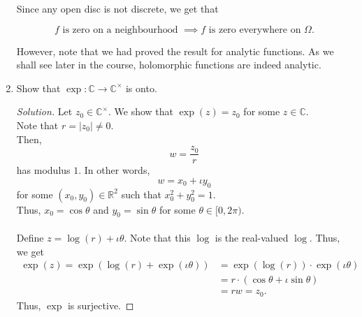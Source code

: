 \documentclass[12pt]{article}
\theoremstyle{definition}
\numberwithin{thm}{section}
\newenvironment{soln}{\begin{proof}[Solution]}{\end{proof}}
\begin{document}
\begin{enumerate}
		Since any open disc is not discrete, we get that

		\begin{mdframed}
			\begin{equation*} 
				f \text{ is zero on a neighbourhood } \implies f \text{ is zero everywhere on }\Omega.
			\end{equation*}
		\end{mdframed}

		However, note that we had proved the result for analytic functions. As we shall see later in the course, holomorphic functions are indeed analytic.
	\item Show that $\exp:\mathbb{C}\to\mathbb{C}^\times$ is onto.
	\begin{soln}
		Let $z_0 \in \mathbb{C}^\times.$ We show that $\exp(z) = z_0$ for some $z \in \mathbb{C}.$ \\
		Note that $r = |z_0| \neq 0.$\\
		Then,
		\begin{equation*} 
			w = \dfrac{z_0}{r}
		\end{equation*}
		has modulus $1.$ In other words,
		\begin{equation*} 
			w = x_0 + \iota y_0
		\end{equation*}
		for some $(x_0, y_0) \in \mathbb{R}^2$ such that $x_0^2 + y_0^2 = 1.$\\
		Thus, $x_0 = \cos\theta$ and $y_0 = \sin\theta$ for some $\theta \in [0, 2\pi).$\\~\\
		Define $z = \log(r) + \iota\theta.$ Note that this $\log$ is the real-valued $\log.$ Thus, we get
		\begin{align*} 
			\exp(z) = \exp(\log(r) + \exp(\iota\theta)) &= \exp(\log(r))\cdot\exp(\iota\theta)\\
			&= r\cdot(\cos\theta + \iota\sin\theta)\\
			&= rw = z_0.
		\end{align*}
		Thus, $\exp$ is surjective.
	\end{soln}


\end{enumerate}
\end{document}
